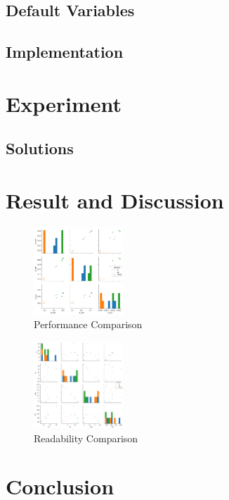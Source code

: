 \documentclass[conference]{IEEEtran}
\begin{document}
\subsection{Default Variables}

\subsection{Implementation}

\section{Experiment}

\subsection{Solutions}

\section{Result and Discussion}


\begin{figure}
	\centering
	\includegraphics[width=0.3\textwidth]
		{benchmark/benchmark.png}
	\caption{Performance Comparison}
	\label{fig:performanceComparison}
\end{figure}


\begin{figure}
	\centering
	\includegraphics[width=0.3\textwidth]
		{benchmark/readability.png}
	\caption{Readability Comparison}
	\label{fig:readabilityComparison}
\end{figure}

\section{Conclusion}
\end{document}

